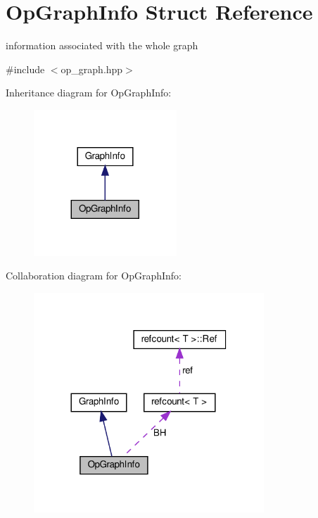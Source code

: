 \hypertarget{structOpGraphInfo}{}\section{Op\+Graph\+Info Struct Reference}
\label{structOpGraphInfo}


information associated with the whole graph  




{\ttfamily \#include $<$op\+\_\+graph.\+hpp$>$}



Inheritance diagram for Op\+Graph\+Info\+:
\nopagebreak
\begin{figure}[H]
\begin{center}
\leavevmode
\includegraphics[width=152pt]{d7/d07/structOpGraphInfo__inherit__graph}
\end{center}
\end{figure}


Collaboration diagram for Op\+Graph\+Info\+:
\nopagebreak
\begin{figure}[H]
\begin{center}
\leavevmode
\includegraphics[width=245pt]{d2/dd0/structOpGraphInfo__coll__graph}
\end{center}
\end{figure}
